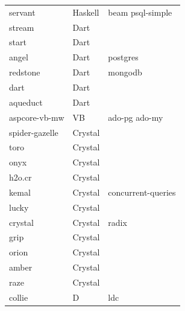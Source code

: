 \begin{longtable}{lll}
    servant          & Haskell     & beam psql-simple                                   \\
    stream           & Dart        &                                                    \\
    start            & Dart        &                                                    \\
    angel            & Dart        & postgres                                           \\
    redstone         & Dart        & mongodb                                            \\
    dart             & Dart        &                                                    \\
    aqueduct         & Dart        &                                                    \\
    aspcore-vb-mw    & VB          & ado-pg ado-my                                      \\
    spider-gazelle   & Crystal     &                                                    \\
    toro             & Crystal     &                                                    \\
    onyx             & Crystal     &                                                    \\
    h2o.cr           & Crystal     &                                                    \\
    kemal            & Crystal     & concurrent-queries                                 \\
    lucky            & Crystal     &                                                    \\
    crystal          & Crystal     & radix                                              \\
    grip             & Crystal     &                                                    \\
    orion            & Crystal     &                                                    \\
    amber            & Crystal     &                                                    \\
    raze             & Crystal     &                                                    \\
    collie           & D           & ldc                                                \\

\end{longtable}
